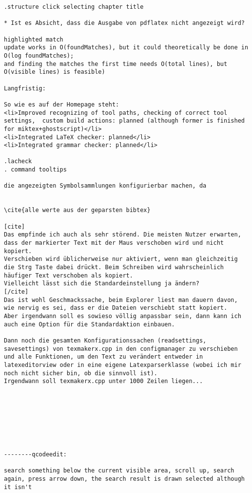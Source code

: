 \documentclass[10pt,a4paper,landscape]{report}
\begin{document}
\begin{verbatim}
.structure click selecting chapter title

* Ist es Absicht, dass die Ausgabe von pdflatex nicht angezeigt wird?

highlighted match
update works in O(foundMatches), but it could theoretically be done in O(log foundMatches);
and finding the matches the first time needs O(total lines), but O(visible lines) is feasible)

Langfristig:

So wie es auf der Homepage steht:
<li>Improved recognizing of tool paths, checking of correct tool settings,  custom build actions: planned (although former is finished for miktex+ghostscript)</li>
<li>Integrated LaTeX checker: planned</li>
<li>Integrated grammar checker: planned</li>

.lacheck
. command tooltips

die angezeigten Symbolsammlungen konfigurierbar machen, da


\cite{alle werte aus der geparsten bibtex}

[cite]
Das empfinde ich auch als sehr störend. Die meisten Nutzer erwarten, dass der markierter Text mit der Maus verschoben wird und nicht kopiert.
Verschieben wird üblicherweise nur aktiviert, wenn man gleichzeitig die Strg Taste dabei drückt. Beim Schreiben wird wahrscheinlich häufiger Text verschoben als kopiert.
Vielleicht lässt sich die Standardeinstellung ja ändern? 
[/cite]
Das ist wohl Geschmackssache, beim Explorer liest man dauern davon, wie nervig es sei, dass er die Dateien verschiebt statt kopiert.
Aber irgendwann soll es sowieso völlig anpassbar sein, dann kann ich auch eine Option für die Standardaktion einbauen.

Dann noch die gesamten Konfigurationssachen (readsettings, savesettings) von texmakerx.cpp in den configmanager zu verschieben und alle Funktionen, um den Text zu verändert entweder in latexeditorview oder in eine eigene Latexparserklasse (wobei ich mir noch nicht sicher bin, ob die sinnvoll ist).
Irgendwann soll texmakerx.cpp unter 1000 Zeilen liegen...








--------qcodeedit:

search something below the current visible area, scroll up, search again, press arrow down, the search result is drawn selected although it isn't

\end{verbatim}
\end{document}
